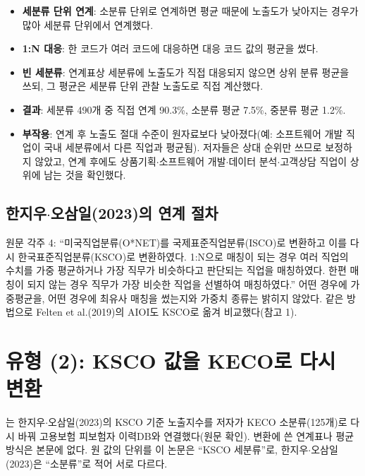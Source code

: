 \documentclass[11pt]{article}
\begin{document}
\begin{itemize}
  \item \textbf{세분류 단위 연계}: 소분류 단위로 연계하면 평균 때문에 노출도가 낮아지는 경우가 많아 세분류 단위에서 연계했다.
  \item \textbf{1:N 대응}: 한 코드가 여러 코드에 대응하면 대응 코드 값의 평균을 썼다.
  \item \textbf{빈 세분류}: 연계표상 세분류에 노출도가 직접 대응되지 않으면 상위 분류 평균을 쓰되, 그 평균은 세분류 단위 관찰 노출도로 직접 계산했다.
  \item \textbf{결과}: 세분류 490개 중 직접 연계 90.3\%, 소분류 평균 7.5\%, 중분류 평균 1.2\%.
  \item \textbf{부작용}: 연계 후 노출도 절대 수준이 원자료보다 낮아졌다(예: 소프트웨어 개발 직업이 국내 세분류에서 다른 직업과 평균됨). 저자들은 상대 순위만 쓰므로 보정하지 않았고, 연계 후에도 상품기획$\cdot$소프트웨어 개발$\cdot$데이터 분석$\cdot$고객상담 직업이 상위에 남는 것을 확인했다.
\end{itemize}

\subsection{한지우$\cdot$오삼일(2023)의 연계 절차}

원문 각주 4: ``미국직업분류(O*NET)를 국제표준직업분류(ISCO)로 변환하고 이를 다시 한국표준직업분류(KSCO)로 변환하였다. 1:N으로 매칭이 되는 경우 여러 직업의 수치를 가중 평균하거나 가장 직무가 비슷하다고 판단되는 직업을 매칭하였다. 한편 매칭이 되지 않는 경우 직무가 가장 비슷한 직업을 선별하여 매칭하였다.'' 어떤 경우에 가중평균을, 어떤 경우에 최유사 매칭을 썼는지와 가중치 종류는 밝히지 않았다. 같은 방법으로 Felten et al.(2019)의 AIOI도 KSCO로 옮겨 비교했다(참고 1).

\section{유형 (2): KSCO 값을 KECO로 다시 변환}

\textcite{kim-2025-youth-job-choice-ai-exposure}는 한지우$\cdot$오삼일(2023)의 KSCO 기준 노출지수를 저자가 KECO 소분류(125개)로 다시 바꿔 고용보험 피보험자 이력DB와 연결했다(원문 확인). 변환에 쓴 연계표나 평균 방식은 본문에 없다. 원 값의 단위를 이 논문은 ``KSCO 세분류''로, 한지우$\cdot$오삼일(2023)은 ``소분류''로 적어 서로 다르다.
\end{document}
